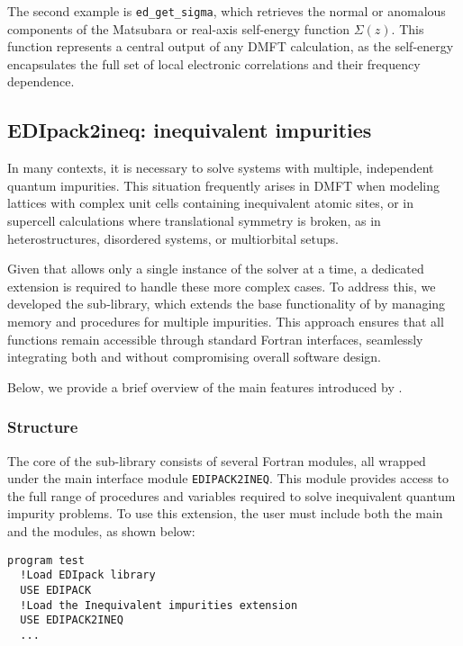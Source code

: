 \documentclass[edipack_sp.tex]{subfiles}
\begin{document}
The second example is \texttt{ed\_get\_sigma}, which retrieves the 
normal or anomalous components of the Matsubara or real-axis 
self-energy function $\Sigma(z)$. This function represents a central 
output of any DMFT calculation, as the self-energy encapsulates the 
full set of local electronic correlations and their frequency 
dependence.







\subsection{EDIpack2ineq: inequivalent impurities}\label{sSecIneq}
In many contexts, it is necessary to solve systems with multiple, 
independent quantum impurities. This situation frequently arises in 
DMFT when modeling lattices with complex unit cells containing 
inequivalent atomic sites, or in supercell calculations where 
translational symmetry is broken, as in heterostructures, disordered 
systems, or multiorbital setups. 

Given that \NAME allows only a single instance of the solver at a 
time, a dedicated extension is required to handle these more complex 
cases. To address this, we developed the  
sub-library, which extends the base functionality of \NAME by managing 
memory and procedures for multiple impurities. This approach ensures 
that all functions remain accessible through standard Fortran 
interfaces, seamlessly integrating both \NAME and  
without compromising overall software design.

Below, we provide a brief overview of the main features introduced by 
.

\subsubsection{Structure}\label{ssSecIneqStructure}
The core of the  sub-library consists of several 
Fortran modules, all wrapped under the main interface module 
{\tt EDIPACK2INEQ}. This module provides access to the full range of 
procedures and variables required to solve inequivalent quantum 
impurity problems. To use this extension, the user must include both 
the main \NAME and the  modules, as shown below:
\begin{lstlisting}[style=fstyle,numbers=none,basicstyle={\scriptsize\ttfamily}]
program test
  !Load EDIpack library 
  USE EDIPACK
  !Load the Inequivalent impurities extension
  USE EDIPACK2INEQ
  ...
\end{lstlisting}
\end{document}

